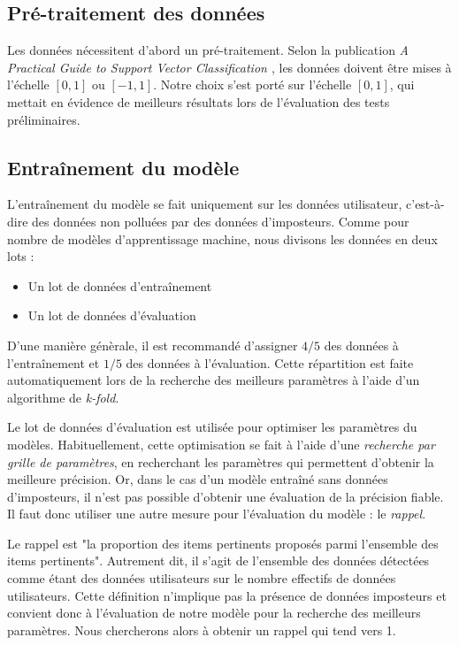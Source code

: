 \subsection{Pré-traitement des données}

Les données nécessitent d'abord un pré-traitement. Selon la publication \textit{A Practical Guide to Support Vector Classification \cite{svmpractical}}, les données doivent être mises à l'échelle $[0, 1]$ ou $[-1, 1]$. Notre choix s'est porté sur l'échelle $[0, 1]$, qui mettait en évidence de meilleurs résultats lors de l'évaluation des tests préliminaires.

\subsection{Entraînement du modèle}

L'entraînement du modèle se fait uniquement sur les données utilisateur, c'est-à-dire des données non polluées par des données d'imposteurs. Comme pour nombre de modèles d'apprentissage machine, nous divisons les données en deux lots :

\begin{itemize}
    \item Un lot de données d'entraînement
    \item Un lot de données d'évaluation
\end{itemize}

D'une manière génèrale, il est recommandé d'assigner $4/5$ des données à l'entraînement et $1/5$ des données à l'évaluation. Cette répartition est faite automatiquement lors de la recherche des meilleurs paramètres à l'aide d'un algorithme de \textit{k-fold}.

Le lot de données d'évaluation est utilisée pour optimiser les paramètres du modèles. Habituellement, cette optimisation se fait à l'aide d'une \textit{recherche par grille de paramètres}, en recherchant les paramètres qui permettent d'obtenir la meilleure précision. Or, dans le cas d'un modèle entraîné sans données d'imposteurs, il n'est pas possible d'obtenir une évaluation de la précision fiable. Il faut donc utiliser une autre mesure pour l'évaluation du modèle : le \textit{rappel}.

Le rappel est "la proportion des items pertinents proposés parmi l'ensemble des items pertinents". Autrement dit, il s'agit de l'ensemble des données détectées comme étant des données utilisateurs sur le nombre effectifs de données utilisateurs. Cette définition n'implique pas la présence de données imposteurs et convient donc à l'évaluation de notre modèle pour la recherche des meilleurs paramètres. Nous chercherons alors à obtenir un rappel qui tend vers 1.

